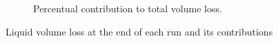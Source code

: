 \begin{figure}[ht]
\begin{subfigure}[b]{0.45\textwidth}
   \vspace*{-0.2in}
   \caption{Percentual contribution to total volume loss.}
\end{subfigure}

   \caption{Liquid volume loss at the end of each run and its contributions}
\label{fig:JICF_liquid_losses_bar_graph}
\end{figure}

